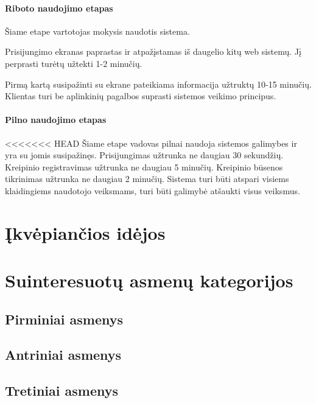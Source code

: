 			\paragraph{Riboto naudojimo etapas}
			
			Šiame etape vartotojas mokysis naudotis sistema.
			
			Prisijungimo ekranas paprastas ir atpažįstamas iš daugelio kitų web sistemų.
			Jį perprasti turėtų užtekti 1-2 minučių.

			Pirmą kartą susipažinti su ekrane pateikiama informacija užtruktų 10-15 minučių.
			Klientas turi be aplinkinių pagalbos suprasti sistemos veikimo principus.
			
			\setcounter{tocdepth}{5} \setcounter{secnumdepth}{5}
			
			\paragraph{Pilno naudojimo etapas}
			
<<<<<<< HEAD
			Šiame etape vadovas pilnai naudoja sistemos galimybes ir yra su jomis susipažinęs.
			Prisijungimas užtrunka ne daugiau 30 sekundžių. Kreipinio registravimas užtrunka ne daugiau 5 minučių.
			Kreipinio būsenos tikrinimas užtrunka ne daugiau 2 minučių.
			Sistema turi būti atspari visiems klaidingiems naudotojo veiksmams, turi būti galimybė atšaukti visus veiksmus.
			
\section{Įkvėpiančios idėjos}
\section{Suinteresuotų asmenų kategorijos}
	\subsection{Pirminiai asmenys}
	
	\subsection{Antriniai asmenys}
	
	\subsection{Tretiniai asmenys}
	
